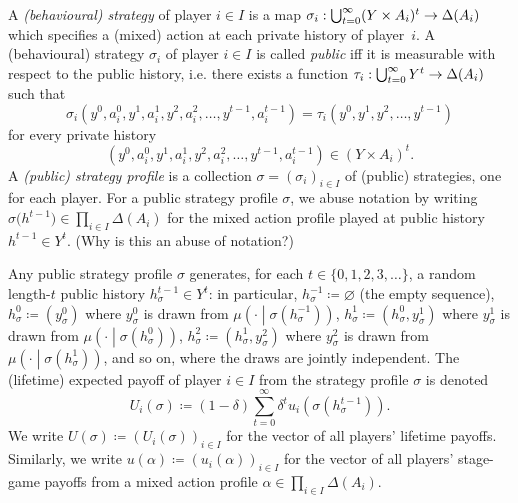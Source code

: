 A \emph{(behavioural) strategy} of player $i \in I$ is a map $\sigma_i : \bigcup_{t=0}^\infty (Y \times A_i)^t \to \Delta(A_i)$ which specifies a (mixed) action at each private history of player~$i$. A (behavioural) strategy $\sigma_i$ of player $i \in I$ is called \emph{public} iff it is measurable with respect to the public history, i.e. there exists a function $\tau_i : \bigcup_{t=0}^\infty Y^t \to \Delta(A_i)$ such that
%
\begin{equation*}
	\sigma_i\left(y^0,a^0_i,y^1,a^1_i,y^2,a^2_i,\dots,y^{t-1},a^{t-1}_i\right)
	= \tau_i\left( y^0, y^1, y^2, \dots, y^{t-1} \right)
\end{equation*}
%
for every private history
%
\begin{equation*}
	\left(y^0,a^0_i,y^1,a^1_i,y^2,a^2_i,\dots,y^{t-1},a^{t-1}_i\right)
	\in (Y \times A_i)^t .
\end{equation*}
%
A \emph{(public) strategy profile} is a collection $\sigma = (\sigma_i)_{i \in I}$ of (public) strategies, one for each player. For a public strategy profile $\sigma$, we abuse notation by writing $\sigma\bigl(h^{t-1}\bigr) \in \prod_{i \in I} \Delta(A_i)$ for the mixed action profile played at public history $h^{t-1} \in Y^t$. (Why is this an abuse of notation?)

Any public strategy profile $\sigma$ generates, for each $t \in \{0,1,2,3,\dots\}$, a random length-$t$ public history $h^{t-1}_\sigma \in Y^t$: in particular, $h^{-1}_\sigma \coloneqq \varnothing$ (the empty sequence), $h^0_\sigma \coloneqq (y^0_\sigma)$ where $y^0_\sigma$ is drawn from $\mu\left( \cdot \middle| \sigma\left( h^{-1}_\sigma \right) \right)$, $h^1_\sigma \coloneqq \left(h^0_\sigma,y^1_\sigma\right)$ where $y^1_\sigma$ is drawn from $\mu\left( \cdot \middle| \sigma\left( h^0_\sigma \right) \right)$, $h^2_\sigma \coloneqq \left(h^1_\sigma,y^2_\sigma\right)$ where $y^2_\sigma$ is drawn from $\mu\left( \cdot \middle| \sigma\left( h^1_\sigma \right) \right)$, and so on, where the draws are jointly independent. The (lifetime) expected payoff of player $i \in I$ from the strategy profile $\sigma$ is denoted
%
\begin{equation*}
	U_i(\sigma) \coloneqq (1-\delta) \sum_{t=0}^\infty \delta^t u_i\left( \sigma\left(h^{t-1}_\sigma\right) \right) .
\end{equation*}
%
We write $U(\sigma) \coloneqq (U_i(\sigma))_{i \in I}$ for the vector of all players' lifetime payoffs. Similarly, we write $u(\alpha) \coloneqq (u_i(\alpha))_{i \in I}$ for the vector of all players' stage-game payoffs from a mixed action profile $\alpha \in \prod_{i \in I} \Delta(A_i)$.

